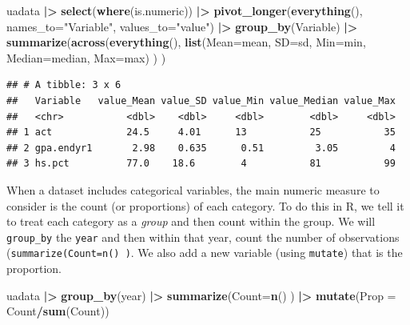 \documentclass[
]{book}
\newenvironment{Shaded}{\begin{snugshade}}{\end{snugshade}}
\newcommand{\AttributeTok}[1]{\textcolor[rgb]{0.13,0.29,0.53}{#1}}
\newcommand{\FunctionTok}[1]{\textcolor[rgb]{0.13,0.29,0.53}{\textbf{#1}}}
\newcommand{\NormalTok}[1]{#1}
\newcommand{\SpecialCharTok}[1]{\textcolor[rgb]{0.81,0.36,0.00}{\textbf{#1}}}
\newcommand{\StringTok}[1]{\textcolor[rgb]{0.31,0.60,0.02}{#1}}
\begin{document}
\begin{Shaded}
\begin{Highlighting}[]
\NormalTok{uadata }\SpecialCharTok{|\textgreater{}}
  \FunctionTok{select}\NormalTok{(}\FunctionTok{where}\NormalTok{(is.numeric)) }\SpecialCharTok{|\textgreater{}}
  \FunctionTok{pivot\_longer}\NormalTok{(}\FunctionTok{everything}\NormalTok{(), }\AttributeTok{names\_to=}\StringTok{"Variable"}\NormalTok{, }\AttributeTok{values\_to=}\StringTok{"value"}\NormalTok{) }\SpecialCharTok{|\textgreater{}} 
  \FunctionTok{group\_by}\NormalTok{(Variable) }\SpecialCharTok{|\textgreater{}}
  \FunctionTok{summarize}\NormalTok{(}\FunctionTok{across}\NormalTok{(}\FunctionTok{everything}\NormalTok{(), }
                   \FunctionTok{list}\NormalTok{(}\AttributeTok{Mean=}\NormalTok{mean, }\AttributeTok{SD=}\NormalTok{sd, }\AttributeTok{Min=}\NormalTok{min, }\AttributeTok{Median=}\NormalTok{median, }\AttributeTok{Max=}\NormalTok{max) ) )}
\end{Highlighting}
\end{Shaded}

\begin{verbatim}
## # A tibble: 3 x 6
##   Variable   value_Mean value_SD value_Min value_Median value_Max
##   <chr>           <dbl>    <dbl>     <dbl>        <dbl>     <dbl>
## 1 act             24.5     4.01      13           25           35
## 2 gpa.endyr1       2.98    0.635      0.51         3.05         4
## 3 hs.pct          77.0    18.6        4           81           99
\end{verbatim}

When a dataset includes categorical variables, the main numeric measure to consider is the count (or proportions) of each category. To do this in R, we tell it to treat each category as a \emph{group} and then count within the group. We will \texttt{group\_by} the \texttt{year} and then within that year, count the number of observations (\texttt{summarize(Count=n()\ )}. We also add a new variable (using \texttt{mutate}) that is the proportion.

\begin{Shaded}
\begin{Highlighting}[]
\NormalTok{uadata }\SpecialCharTok{|\textgreater{}}
  \FunctionTok{group\_by}\NormalTok{(year) }\SpecialCharTok{|\textgreater{}}
  \FunctionTok{summarize}\NormalTok{(}\AttributeTok{Count=}\FunctionTok{n}\NormalTok{() ) }\SpecialCharTok{|\textgreater{}}
  \FunctionTok{mutate}\NormalTok{(}\AttributeTok{Prop =}\NormalTok{ Count}\SpecialCharTok{/}\FunctionTok{sum}\NormalTok{(Count))}
\end{Highlighting}
\end{Shaded}
\end{document}
